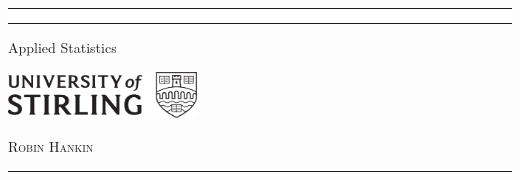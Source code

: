 \begin{centering}
\begin{titlepage} %



	\rule{\textwidth}{1pt} %
	\vspace{2pt}
	\rule{\textwidth}{0.4pt} %

	\vspace{0.1\textheight} %

		{\Huge\sc Applied Statistics}\\[0.5\baselineskip] %

                \vspace{2in}
                
        \includegraphics[width=5cm]{mono-logo}

	\vspace{0.025\textheight} %


	\vspace{0.1\textheight} %

	{\textsc{Robin Hankin}} %

	\vspace{0.1\textheight} %
	\rule{\textwidth}{0.4pt} %

\end{titlepage}
\end{centering}

